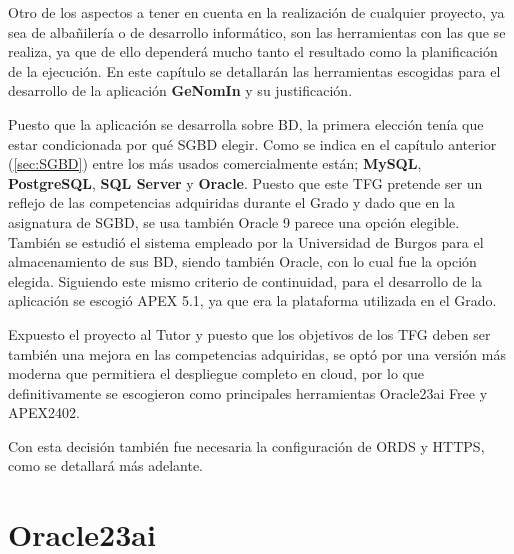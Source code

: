 
Otro de los aspectos a tener en cuenta en la realización de cualquier proyecto, ya sea de albañilería o de desarrollo informático, son las herramientas con las que se realiza, ya que de ello dependerá mucho tanto el resultado como la planificación de la ejecución.
En este capítulo se detallarán las herramientas escogidas para el desarrollo de la aplicación \textbf{GeNomIn} y su justificación.

Puesto que la aplicación se desarrolla sobre BD, la primera elección tenía que estar condicionada por qué \acrshort{SGBD} elegir. Como se indica en el capítulo anterior (\ref{sec:SGBD}) entre los más usados comercialmente están; \textbf{MySQL}, \textbf{PostgreSQL}, \textbf{SQL Server} y \textbf{Oracle}. Puesto que este \acrshort{TFG} pretende ser un reflejo de las competencias adquiridas durante el Grado y dado que en la asignatura de \acrshort{SGBD}, se usa también Oracle 9 parece una opción elegible. También se estudió el sistema empleado por la Universidad de Burgos para el almacenamiento de sus BD, siendo también Oracle, con lo cual fue la opción elegida.
Siguiendo este mismo criterio de continuidad, para el desarrollo de la aplicación se escogió \acrshort{APEX} 5.1, ya que era la plataforma utilizada en el Grado.

Expuesto el proyecto al Tutor y puesto que los objetivos de los \acrshort{TFG} deben ser también una mejora en las competencias adquiridas, se optó por una versión más moderna que permitiera el despliegue completo en cloud, por lo que definitivamente se escogieron como principales herramientas Oracle23ai Free y \acrshort{APEX}2402.

Con esta decisión también fue necesaria la configuración de \acrshort{ORDS} y \acrshort{HTTPS}, como se detallará más adelante.

\section{Oracle23ai}

